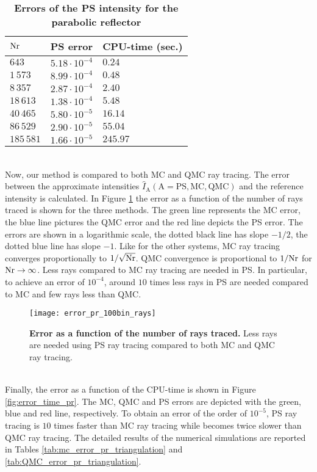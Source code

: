 \begin{table}[t] \label{tab:table_pr_triangulation}
\centering
\caption{\bf Errors of the PS intensity for the parabolic reflector}
\begin{tabular}{lll}
 \hline   $\textrm{Nr}$ & PS error & CPU-time (sec.) \\
  \hline 
 $643$        & $5.18\cdot10^{-4}$ & $0.24$\\
 $1\,573$       & $8.99\cdot 10^{-4}$ & $0.48$\\
 $8\,357$     & $2.87\cdot 10^{-4}$ & $2.40$ \\
 $18\,613$     & $1.38\cdot 10^{-4}$ & $5.48$\\
 $40\,465$   & $5.80\cdot 10^{-5}$ & $16.14$\\
 $86\,529$    & $2.90\cdot 10^{-5}$ & $55.04$\\
 $185\,581$   & $1.66\cdot 10^{-5}$ & $245.97$\\
 \hline
 \end{tabular}
\label{tab:table_pr_triangulation}
 \end{table}
\\ \indent 
Now, our method is compared to both MC and QMC ray tracing. 
The error between the approximate intensities $\hat{I}_{\textrm{A}}(\textrm{A}=\textrm{PS}, \textrm{MC}, \textrm{QMC})$ and the reference intensity is calculated. In Figure \ref{fig:error_rays_pr} the error as a function of the number of rays traced is shown for the three methods.
The green line represents the MC error, the blue line pictures the QMC error and the red line depicts the PS error. The errors are shown in a logarithmic scale, the dotted black line has slope $-1/2$, the dotted blue line has slope $-1$. Like for the other systems, MC ray tracing converges proportionally to $1/\sqrt{\textrm{Nr}}$. QMC convergence is proportional to $1/\textrm{Nr}$ for $\textrm{Nr} \rightarrow \infty$. Less rays compared to MC ray tracing are needed in PS. In particular, to achieve an error of $10^{-4}$, around $10$ times less rays in PS are needed compared to MC and few rays less than QMC.
\begin{figure}[t]
  \center
  \texttt{[image: error\_pr\_100bin\_rays]}
  \caption{\textbf{Error as a function of the number of rays traced.} Less rays are needed using PS ray tracing compared to both MC and QMC ray tracing.}
  \label{fig:error_rays_pr}
\end{figure} 
\\ \indent
Finally, the error as a function of the CPU-time is shown in Figure \ref{fig:error_time_pr}. The MC, QMC and PS errors are depicted with the green, blue and red line, respectively. To obtain an error of the order of $10^{-5}$, PS ray tracing is $10$ times faster than MC ray tracing while becomes twice slower than QMC ray tracing. The detailed results of the numerical simulations are reported in Tables \ref{tab:mc_error_pr_triangulation} and \ref{tab:QMC_error_pr_triangulation}.
